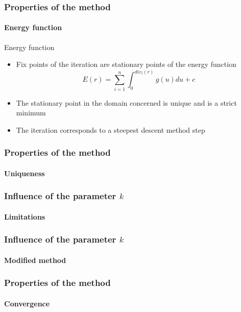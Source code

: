 \begin{frame}
\frametitle{Properties of the method}
\framesubtitle{Energy function}
\begin{block}{Energy function}
\begin{itemize}
\item Fix points of the iteration are stationary points of the energy function
$$E(r) =  \sum_{i=1}^n \int_0^{div_i(r)}g(u) du + c $$
\item The stationary point in the domain concerned is unique and is a strict minimum
\item The iteration corresponds to a steepest descent method step
\end{itemize}
\end{block}
\end{frame}
\begin{frame}
\frametitle{Properties of the method}
\framesubtitle{Uniqueness}
\begin{block}

\end{block}
\end{frame}

\begin{frame}
\frametitle{Influence of the parameter $k$}
\framesubtitle{Limitations}

\end{frame}

\begin{frame}
\frametitle{Influence of the parameter $k$}
\framesubtitle{Modified method}
\end{frame}

\begin{frame}
\frametitle{Properties of the method}
\framesubtitle{Convergence}

\end{frame}

